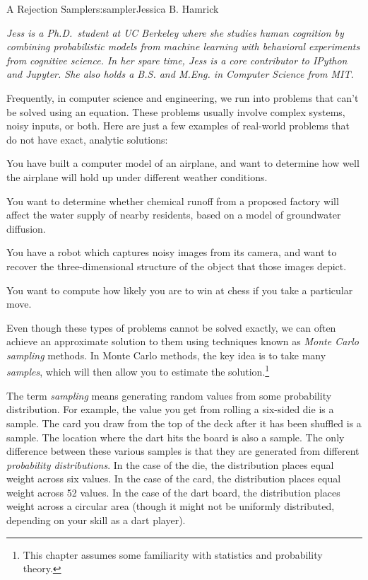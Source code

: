 \begin{aosachapter}{A Rejection Sampler}{s:sampler}{Jessica B. Hamrick}

\emph{Jess is a Ph.D.~student at UC Berkeley where she studies human
cognition by combining probabilistic models from machine learning with
behavioral experiments from cognitive science. In her spare time, Jess
is a core contributor to IPython and Jupyter. She also holds a B.S. and
M.Eng. in Computer Science from MIT.}

\label{introduction}

Frequently, in computer science and engineering, we run into problems
that can't be solved using an equation. These problems usually involve
complex systems, noisy inputs, or both. Here are just a few examples of
real-world problems that do not have exact, analytic solutions:

\begin{aosaenumerate}
\def\labelenumi{\arabic{enumi}.}
\item
  You have built a computer model of an airplane, and want to determine
  how well the airplane will hold up under different weather conditions.
\item
  You want to determine whether chemical runoff from a proposed factory
  will affect the water supply of nearby residents, based on a model of
  groundwater diffusion.
\item
  You have a robot which captures noisy images from its camera, and want
  to recover the three-dimensional structure of the object that those
  images depict.
\item
  You want to compute how likely you are to win at chess if you take a
  particular move.
\end{aosaenumerate}

Even though these types of problems cannot be solved exactly, we can
often achieve an approximate solution to them using techniques known as
\emph{Monte Carlo sampling} methods. In Monte Carlo methods, the key
idea is to take many \emph{samples}, which will then allow you to
estimate the solution.\footnote{This chapter assumes some familiarity
  with statistics and probability theory.}

\label{what-is-sampling}

The term \emph{sampling} means generating random values from some
probability distribution. For example, the value you get from rolling a
six-sided die is a sample. The card you draw from the top of the deck
after it has been shuffled is a sample. The location where the dart hits
the board is also a sample. The only difference between these various
samples is that they are generated from different \emph{probability
distributions}. In the case of the die, the distribution places equal
weight across six values. In the case of the card, the distribution
places equal weight across 52 values. In the case of the dart board, the
distribution places weight across a circular area (though it might not
be uniformly distributed, depending on your skill as a dart player).


\end{aosachapter}
